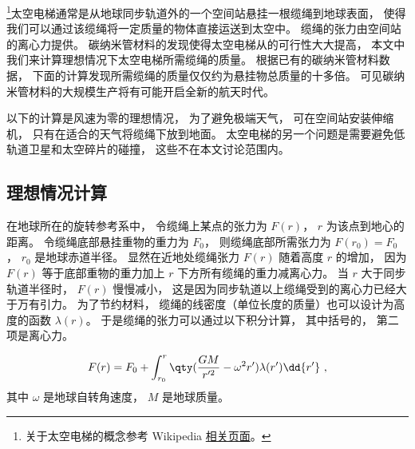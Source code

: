 

\footnote{关于太空电梯的概念参考 Wikipedia \href{https://en.wikipedia.org/wiki/Space_elevator}{相关页面}。}太空电梯通常是从地球同步轨道外的一个空间站悬挂一根缆绳到地球表面， 使得我们可以通过该缆绳将一定质量的物体直接运送到太空中。 缆绳的张力由空间站的离心力提供。 碳纳米管材料的发现使得太空电梯从的可行性大大提高， 本文中我们来计算理想情况下太空电梯所需缆绳的质量。 根据已有的碳纳米管材料数据， 下面的计算发现所需缆绳的质量仅仅约为悬挂物总质量的十多倍。 可见碳纳米管材料的大规模生产将有可能开启全新的航天时代。

以下的计算是风速为零的理想情况， 为了避免极端天气， 可在空间站安装伸缩机， 只有在适合的天气将缆绳下放到地面。 太空电梯的另一个问题是需要避免低轨道卫星和太空碎片的碰撞， 这些不在本文讨论范围内。

\subsection{理想情况计算}
在地球所在的旋转参考系中， 令缆绳上某点的张力为 $F(r)$， $r$ 为该点到地心的距离。 令缆绳底部悬挂重物的重力为 $F_0$， 则缆绳底部所需张力为 $F(r_0) = F_0$， $r_0$ 是地球赤道半径。 显然在近地处缆绳张力 $F(r)$ 随着高度 $r$ 的增加， 因为 $F(r)$ 等于底部重物的重力加上 $r$ 下方所有缆绳的重力减离心力。 当 $r$ 大于同步轨道半径时， $F(r)$ 慢慢减小， 这是因为同步轨道以上缆绳受到的离心力已经大于万有引力。 为了节约材料， 缆绳的线密度（单位长度的质量）也可以设计为高度的函数 $\lambda(r)$。 于是缆绳的张力可以通过以下积分计算， 其中括号的， 第二项是离心力。

\begin{equation}\label{eq_SpcLad_1}
F(r) = F_0 + \int_{r_0}^{r} \qty(\frac{GM}{r'^2} - \omega^2 r') \lambda(r') \dd{r'}~,
\end{equation}
其中 $\omega$ 是地球自转角速度， $M$ 是地球质量。

